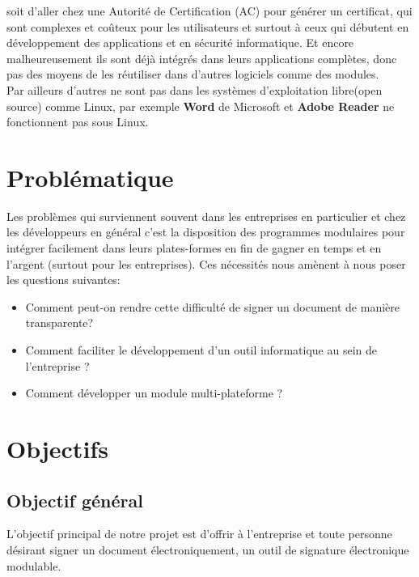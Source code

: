 		soit d'aller chez une Autorité de Certification (AC) pour générer un certificat, qui sont complexes et coûteux pour les utilisateurs et surtout à ceux qui débutent en développement des applications et en sécurité informatique. Et encore malheureusement ils sont déjà intégrés dans leurs applications complètes, donc pas des moyens de les réutiliser dans  d'autres logiciels comme des modules.\\
		
		Par ailleurs d'autres ne sont pas dans les systèmes d'exploitation libre(open source) comme Linux, par exemple \textbf{Word} de Microsoft et \textbf{Adobe Reader }ne fonctionnent pas sous Linux. 
	
	\section{Problématique}
			Les problèmes qui surviennent souvent dans les entreprises en particulier et chez les développeurs en général c'est la disposition des programmes modulaires pour intégrer facilement dans leurs plates-formes en fin de gagner en temps et en l'argent (surtout pour les entreprises). Ces nécessités nous amènent à nous poser les questions suivantes:\\
		
	\begin{itemize}
		\item Comment peut-on rendre cette difficulté de signer un document de manière transparente?
		\item Comment faciliter le développement d'un outil informatique au sein de l'entreprise ?
		
		\item Comment développer un module multi-plateforme ?
	\end{itemize}
	
	
	\section{Objectifs}
	
		\subsection{Objectif général}
			L'objectif principal de notre projet est d'offrir à l'entreprise et toute personne désirant signer un document électroniquement, un outil de signature électronique modulable. 
		
